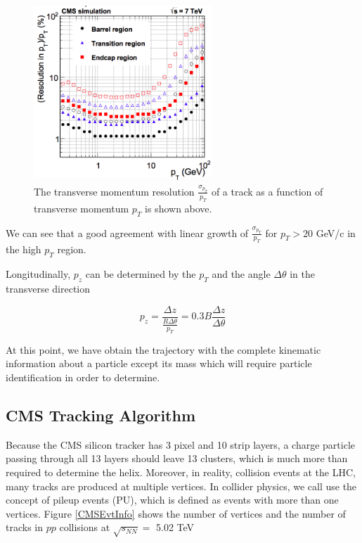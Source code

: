 \begin{figure}[hbtp]
\begin{center}
\includegraphics[width=0.60\textwidth]{Figures/Chapter3/CMSpTReso.png}
\caption{The transverse momentum resolution $\frac{\sigma_{p_T}}{p_T}$ of a track as a function of transverse momentum $p_T$ is shown above.}
\label{CMSpTReso}
\end{center}
\end{figure} 

We can see that a good agreement with linear growth of $\frac{\sigma_{p_T}}{p_T}$ for $p_T > 20$ GeV/c in the high $p_T$ region.

Longitudinally, $p_z$ can be determined by the $p_T$ and the angle $\Delta \theta$ in the transverse direction 

\begin{equation}
p_z = \frac{\Delta z}{\frac{R\Delta \theta}{p_T}} = 0.3B \frac{\Delta z}{\Delta \theta}
\end{equation}

At this point, we have obtain the trajectory with the complete kinematic information about a particle except its mass which will require particle identification in order to determine.

\subsection{CMS Tracking Algorithm}


Because the CMS silicon tracker has 3 pixel and 10 strip layers, a charge particle passing through all 13 layers should leave 13 clusters, which is much more than required to determine the helix. Moreover, in reality, collision events at the LHC, many tracks are produced at multiple vertices. In collider physics, we call use the concept of pileup events (PU), which is defined as events with more than one vertices. Figure \ref{CMSEvtInfo} shows the number of vertices and the number of tracks in $pp$ collisions at $\sqrt{s_{NN}} = $ 5.02 TeV

